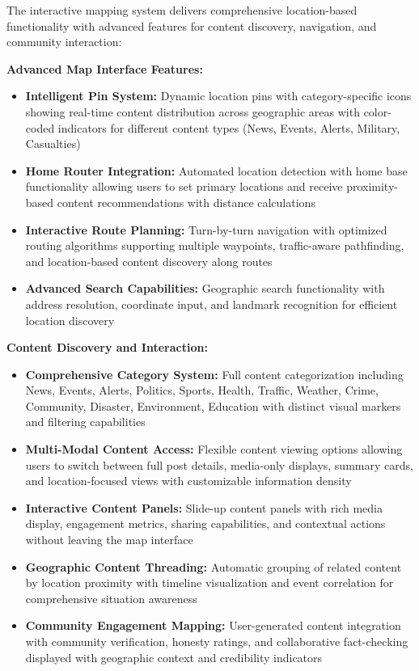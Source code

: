 The interactive mapping system delivers comprehensive location-based functionality with advanced features for content discovery, navigation, and community interaction:

\textbf{Advanced Map Interface Features:}
\begin{itemize}
    \item \textbf{Intelligent Pin System:} Dynamic location pins with category-specific icons showing real-time content distribution across geographic areas with color-coded indicators for different content types (News, Events, Alerts, Military, Casualties)
    \item \textbf{Home Router Integration:} Automated location detection with home base functionality allowing users to set primary locations and receive proximity-based content recommendations with distance calculations
    \item \textbf{Interactive Route Planning:} Turn-by-turn navigation with optimized routing algorithms supporting multiple waypoints, traffic-aware pathfinding, and location-based content discovery along routes
    \item \textbf{Advanced Search Capabilities:} Geographic search functionality with address resolution, coordinate input, and landmark recognition for efficient location discovery
\end{itemize}
\clearpage

\textbf{Content Discovery and Interaction:}
\begin{itemize}
    \item \textbf{Comprehensive Category System:} Full content categorization including News, Events, Alerts, Politics, Sports, Health, Traffic, Weather, Crime, Community, Disaster, Environment, Education with distinct visual markers and filtering capabilities
    \item \textbf{Multi-Modal Content Access:} Flexible content viewing options allowing users to switch between full post details, media-only displays, summary cards, and location-focused views with customizable information density
    \item \textbf{Interactive Content Panels:} Slide-up content panels with rich media display, engagement metrics, sharing capabilities, and contextual actions without leaving the map interface
    \item \textbf{Geographic Content Threading:} Automatic grouping of related content by location proximity with timeline visualization and event correlation for comprehensive situation awareness
    \item \textbf{Community Engagement Mapping:} User-generated content integration with community verification, honesty ratings, and collaborative fact-checking displayed with geographic context and credibility indicators
\end{itemize}

